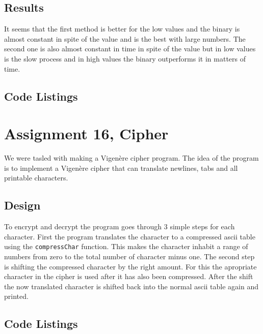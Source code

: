 \documentclass[a4paper]{article}
\begin{document}
\subsection*{Results}
It seems that the first method is better for the low values and the binary is almost constant in spite of the value and is the best with large numbers. The second one is also almost constant in time in spite of the value but in low values is the slow process and in high values the binary outperforms it in matters of time.

\subsection*{Code Listings}







\section*{Assignment 16, Cipher}
We were tasled with making a Vigenère cipher program.
The idea of the program is to implement a Vigenère cipher that can translate newlines, tabs and all printable characters.

\subsection*{Design}
To encrypt and decrypt the program goes through 3 simple steps for each character.
First the program translates the character to a compressed ascii table using the \texttt{compressChar} function.
This makes the character inhabit a range of numbers from zero to the total number of character minus one.
The second step is shifting the compressed character by the right amount.
For this the apropriate character in the cipher is used after it has also been compressed.
After the shift the now translated character is shifted back into the normal ascii table again and printed.

\subsection*{Code Listings}






\end{document}
